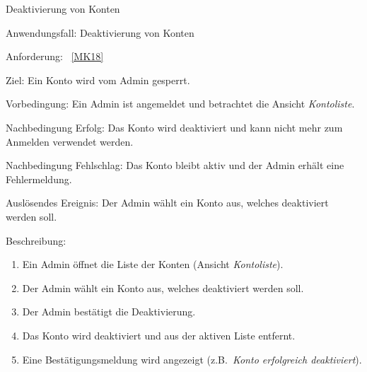 \begin{function}{60}{Deaktivierung von Konten}
    \item[Anwendungsfall:] Deaktivierung von Konten
    \item[Anforderung:] ~\ref{MK18}
    \item[Ziel:] Ein Konto wird vom Admin gesperrt.
    \item[Vorbedingung:] Ein Admin ist angemeldet und betrachtet die Ansicht \textit{Kontoliste}.
    \item[Nachbedingung Erfolg:] Das Konto wird deaktiviert und kann nicht mehr zum Anmelden verwendet werden.
    \item[Nachbedingung Fehlschlag:] Das Konto bleibt aktiv und der Admin erhält eine Fehlermeldung.
    \item[Auslösendes Ereignis:] Der Admin wählt ein Konto aus, welches deaktiviert werden soll.
    \item[Beschreibung:] ~
    \begin{enumerate}
        \item Ein Admin öffnet die Liste der Konten (Ansicht \textit{Kontoliste}).
        \item Der Admin wählt ein Konto aus, welches deaktiviert werden soll.
        \item Der Admin bestätigt die Deaktivierung.
        \item Das Konto wird deaktiviert und aus der aktiven Liste entfernt.
        \item Eine Bestätigungsmeldung wird angezeigt (z.B.\ \textit{Konto erfolgreich deaktiviert}).
    \end{enumerate}
\end{function}

\pagebreak

